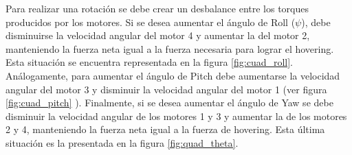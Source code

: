 \documentclass[main]{subfiles}
\begin{document}
\begin{figure}
\centering
{}
\caption{}
\end{figure}

Para realizar una rotaci\'on se debe crear un desbalance entre los torques producidos por los motores. Si se desea aumentar el \'angulo de Roll ($\psi$), debe disminuirse la velocidad  angular del motor 4 y aumentar la del motor 2, manteniendo la fuerza neta igual a la fuerza necesaria para lograr el hovering. Esta situaci\'on se encuentra representada en la figura \ref{fig:cuad_roll}. Análogamente, para aumentar el \'angulo de Pitch debe aumentarse la velocidad angular del motor 3 y disminuir la velocidad angular del motor 1 (ver figura \ref{fig:cuad_pitch} ). Finalmente, si se desea aumentar el \'angulo de Yaw se debe disminuir la velocidad angular de los motores 1 y 3 y aumentar la de los motores 2 y 4, manteniendo la fuerza neta igual a la fuerza de hovering. Esta \'ultima situaci\'on es la presentada en la figura \ref{fig:quad_theta}.
\end{document}
